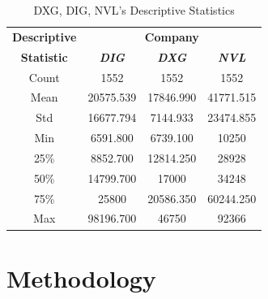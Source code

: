 \documentclass[conference]{IEEEtran}
\begin{document}
\begin{table}[htbp]
\caption{DXG, DIG, NVL’s Descriptive Statistics}
\begin{center}
\begin{tabular}{|c|c|c|c|}
\hline
\textbf{Descriptive}&\multicolumn{3}{|c|}{\textbf{Company}} \\
\cline{2-4} 
\textbf{Statistic} & \textbf{\textit{DIG}}& \textbf{\textit{DXG}}& \textbf{\textit{NVL}} \\
\hline
Count & 1552 & 1552 & 1552  \\
\hline
Mean & 20575.539 & 17846.990 & 41771.515\\
\hline
Std & 16677.794 & 7144.933 & 23474.855\\
\hline
Min & 6591.800 & 6739.100 & 10250\\
\hline
25\% & 8852.700 & 12814.250 & 28928\\
\hline
50\% & 14799.700 & 17000 & 34248\\
\hline
75\% & 25800 & 20586.350 & 60244.250\\
\hline
Max & 98196.700 & 46750 & 92366\\
\hline
\end{tabular}
\label{tab1}
\end{center}
\end{table}

\newpage
\section{Methodology}
\end{document}
